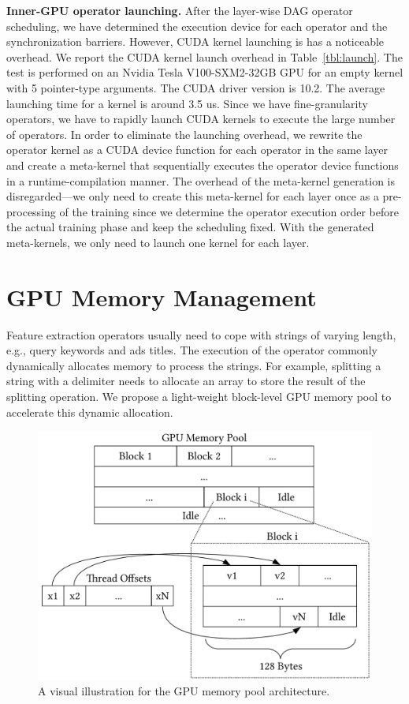 \documentclass[conference]{IEEEtran}
\begin{document}
\textbf{Inner-GPU operator launching.} 
After the layer-wise DAG operator scheduling, we have determined the execution device for each operator and the synchronization barriers. However, CUDA kernel launching is has a noticeable overhead. 
We report the CUDA kernel launch overhead in Table~\ref{tbl:launch}. The test is performed on an Nvidia Tesla V100-SXM2-32GB GPU for an empty kernel with 5 pointer-type arguments. The CUDA driver version is 10.2. The average launching time for a kernel is around 3.5 us. Since we have fine-granularity operators, we have to rapidly launch CUDA kernels to execute the large number of operators. In order to eliminate the launching overhead, we rewrite the operator kernel as a CUDA device function for each operator in the same layer and create a meta-kernel that sequentially executes the operator device functions in a runtime-compilation manner. The overhead of the meta-kernel generation is disregarded---we only need to create this meta-kernel for each layer once as a pre-processing of the training since we determine the operator execution order before the actual training phase and keep the scheduling fixed. 
With the generated meta-kernels, we only need to launch one kernel for each layer.


\section{GPU Memory Management}

Feature extraction operators usually need to cope with strings of varying length, e.g., query keywords and ads titles. The execution of the operator commonly dynamically allocates memory to process the strings. For example, splitting a string with a delimiter needs to allocate an array to store the result of the splitting operation. We propose a light-weight block-level GPU memory pool to accelerate this dynamic allocation. 

\begin{figure}[htbp]
\centering
\includegraphics[width=.5\textwidth]{figs/gpu_memory}
\caption{A visual illustration for the GPU memory pool architecture.}
\label{fig:memory}
\end{figure}
\end{document}
